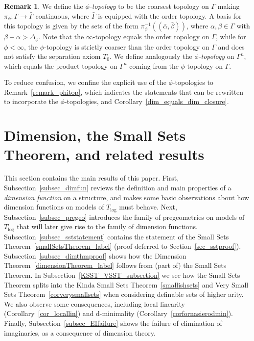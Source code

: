 \documentclass[11pt]{amsart}
\theoremstyle{plain}
\theoremstyle{definition}
\newtheorem{remark}[thm]{Remark}
\numberwithin{equation}{section}
\newcommand\0{\varnothing}
\begin{document}
\begin{remark}\label{remark_phitopdef}
We define the \emph{$\phi$-topology} to be the coarsest topology on $\Gamma$ making $\pi_{\phi} \colon \Gamma \to \bar{\Gamma}$ continuous, where $\bar{\Gamma}$ is equipped with the order topology.
A basis for this topology is given by the sets of the form $\pi^{-1}_{\phi}((\bar{\alpha},\bar{\beta}))$, where $\alpha,\beta \in \Gamma$ with $\beta-\alpha>\Delta_{\phi}$.
Note that the $\infty$-topology equals the order topology on $\Gamma$, while for $\phi<\infty$, the $\phi$-topology is strictly coarser than the order topology on $\Gamma$ and does not satisfy the separation axiom $T_0$.
We define analogously the \emph{$\phi$-topology} on $\Gamma^n$, which equals the product topology on $\Gamma^n$ coming from the $\phi$-topology on $\Gamma$.

To reduce confusion, we confine the explicit use of the $\phi$-topologies to Remark~\ref{remark_phitop}, which indicates the statements that can be rewritten to incorporate the $\phi$-topologies, and Corollary~\ref{dim_equals_dim_closure}.
\end{remark}


\section{Dimension, the Small Sets Theorem, and related results}\label{sec_dimensions_SST}

\noindent
This section contains the main results of this paper.
First, Subsection~\ref{subsec_dimfun} reviews the definition and main properties of a \emph{dimension function} on a structure, and makes some basic observations about how dimension functions on models of $T_{\log}$ must behave.
Next, Subsection~\ref{subsec_pregeo} introduces the family of pregeometries on models of $T_{\log}$ that will later give rise to the family of dimension functions.
Subsection~\ref{subsec_sststatement} contains the statement of the Small Sets Theorem~\ref{smallSetsTheorem_label} (proof deferred to Section~\ref{sec_sstproof}).
Subsection~\ref{subsec_dimthmproof} shows how the Dimension Theorem~\ref{dimensionTheorem_label} follows from (part of) the Small Sets Theorem.
In Subsection~\ref{KSST_VSST_subsection} we see how the Small Sets Theorem splits into the Kinda Small Sets Theorem~\ref{smallishsets} and Very Small Sets Theorem~\ref{corverysmallsets} when considering definable sets of higher arity. We also observe some consequences, including local linearity (Corollary~\ref{cor_locallin}) and d-minimality (Corollary~\ref{corfornasierodmin}).
Finally, Subsection~\ref{subsec_EIfailure} shows the failure of elimination of imaginaries, as a consequence of dimension theory.
\end{document}
